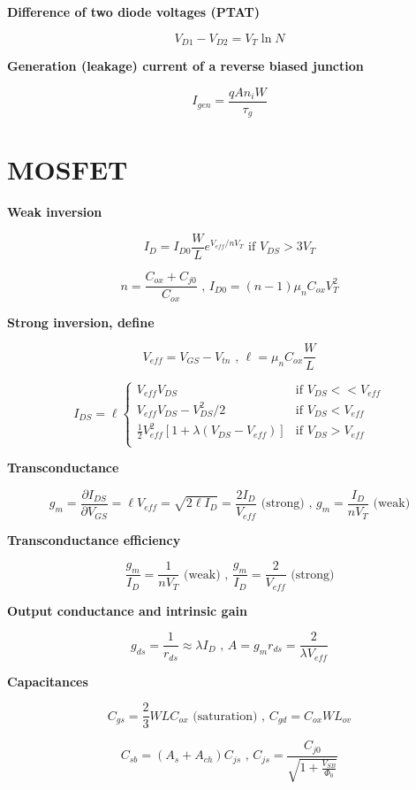 \textbf{Difference of two diode voltages (PTAT)}

\[ V_{D1} - V_{D2} = V_T \ln N \]

\textbf{Generation (leakage) current of a reverse biased junction}

\[ I_{gen} = \frac{q A n_i W}{\tau_g} \]

\section{MOSFET}\label{mosfet}

\textbf{Weak inversion}

\[ I_{D} = I_{D0} \frac{W}{L} e^{V_{eff}/n V_T} \text{ if } V_{DS} > 3V_T \]

\[ n = \frac{C_{ox} + C_{j0}}{C_{ox}} \text{ , } I_{D0} = (n-1)\mu_n C_{ox} V_T^2 \]

\textbf{Strong inversion, define}

\[ V_{eff} = V_{GS} - V_{tn} \text{ , } \ell = \mu_n C_{ox}\frac{W}{L} \]

\[
I_{DS} = \ell
\begin{cases}
V_{eff} V_{DS} & \text{if }V_{DS} << V_{eff} \\[10pt]
V_{eff} V_{DS} - V_{DS}^2/2 & \text{if } V_{DS} < V_{eff}  \\[10pt]
\frac{1}{2} V_{eff}^2\left[1 + \lambda(V_{DS} - V_{eff})\right] & \text{if } V_{DS} > V_{eff} \\[10pt]
\end{cases}
\]

\textbf{Transconductance}

\[ g_m = \frac{\partial I_{DS}}{\partial V_{GS}} = \ell V_{eff} = \sqrt{2 \ell I_D} = \frac{2 I_D}{V_{eff}} \text{ (strong)} \text{ , } g_m = \frac{I_D}{nV_T} \text{ (weak)} \]

\textbf{Transconductance efficiency}

\[ \frac{g_m}{I_D} = \frac{1}{nV_T} \text{ (weak)} \text{ , } \frac{g_m}{I_D} = \frac{2}{V_{eff}} \text{ (strong)} \]

\textbf{Output conductance and intrinsic gain}

\[ g_{ds} = \frac{1}{r_{ds}} \approx \lambda I_D \text{ , } A = g_m r_{ds} = \frac{2}{\lambda V_{eff}} \]

\textbf{Capacitances}

\[ C_{gs} = \frac{2}{3}WLC_{ox} \text{ (saturation)} \text{ , } C_{gd} = C_{ox} W L_{ov} \]

\[ C_{sb} = (A_s + A_{ch}) C_{js} \text{ , } C_{js} = \frac{C_{j0}}{\sqrt{1 + \frac{V_{SB}}{\Phi_0}}} \]

